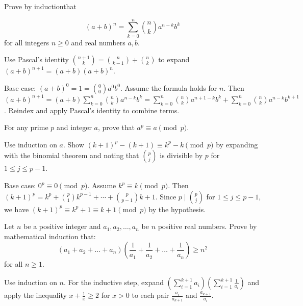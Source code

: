 \begin{problem}
Prove by inductionthat 

$$(a+b)^n = \sum_{k=0}^{n} \binom{n}{k} a^{n-k} b^k$$ 
for all integers $n \ge 0$ and real numbers $a,b$.

\end{problem}

\begin{hint}
Use Pascal's identity $\binom{n+1}{k} = \binom{n}{k-1} + \binom{n}{k}$ to expand $(a+b)^{n+1} = (a+b)(a+b)^n$.
\end{hint}

\begin{solution}[Sketch]
Base case: $(a+b)^0 = 1 = \binom{0}{0}a^0b^0$. Assume the formula holds for $n$. Then $(a+b)^{n+1} = (a+b)\sum_{k=0}^{n}\binom{n}{k}a^{n-k}b^k = \sum_{k=0}^{n}\binom{n}{k}a^{n+1-k}b^k + \sum_{k=0}^{n}\binom{n}{k}a^{n-k}b^{k+1}$. Reindex and apply Pascal's identity to combine terms.
\end{solution}

\begin{problem}
For any prime $p$ and integer $a$, prove that $a^p \equiv a \pmod{p}$.
\end{problem}

\begin{hint}
Use induction on $a$. Show $(k+1)^p - (k+1) \equiv k^p - k \pmod{p}$ by expanding with the binomial theorem and noting that $\binom{p}{j}$ is divisible by $p$ for $1 \le j \le p-1$.
\end{hint}

\begin{solution}[Sketch]
Base case: $0^p \equiv 0 \pmod{p}$. Assume $k^p \equiv k \pmod{p}$. Then $(k+1)^p = k^p + \binom{p}{1}k^{p-1} + \cdots + \binom{p}{p-1}k + 1$. Since $p \mid \binom{p}{j}$ for $1 \le j \le p-1$, we have $(k+1)^p \equiv k^p + 1 \equiv k + 1 \pmod{p}$ by the hypothesis.
\end{solution}

\begin{problem}
Let $n$ be a positive integer and $a_1, a_2, \dots, a_n$ be $n$ positive real numbers. Prove by mathematical induction that:
\[
\left( a_1 + a_2 + \dots + a_n \right) \left( \frac{1}{a_1} + \frac{1}{a_2} + \dots + \frac{1}{a_n} \right) \geq n^2
\]
for all $n \geq 1$.
\end{problem}

\begin{hint}
Use induction on $n$. For the inductive step, expand $\left( \sum_{i=1}^{k+1} a_i \right) \left( \sum_{i=1}^{k+1} \frac{1}{a_i} \right)$ and apply the inequality $x + \frac{1}{x} \geq 2$ for $x > 0$ to each pair $\frac{a_i}{a_{k+1}}$ and $\frac{a_{k+1}}{a_i}$.
\end{hint}

